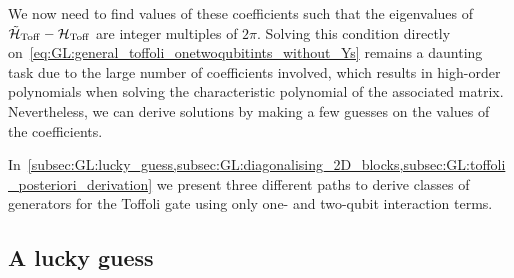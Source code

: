 We now need to find values of these coefficients such that the eigenvalues of $\tilde{{\mathcal{H}}}_{\operatorname{Toff}}-{\mathcal{H}}_{\operatorname{Toff}}$ are integer multiples of $2\pi$.
Solving this condition directly on~\cref{eq:GL:general_toffoli_onetwoqubitints_without_Ys} remains a daunting task due to the large number of coefficients involved, which results in high-order polynomials when solving the characteristic polynomial of the associated matrix.
Nevertheless, we can derive solutions by making a few guesses on the values of the coefficients.

In~\cref{subsec:GL:lucky_guess,subsec:GL:diagonalising_2D_blocks,subsec:GL:toffoli_posteriori_derivation} we present three different paths to derive classes of generators for the Toffoli gate using only one- and two-qubit interaction terms.

\subsection{A lucky guess}
\label{subsec:GL:lucky_guess}

